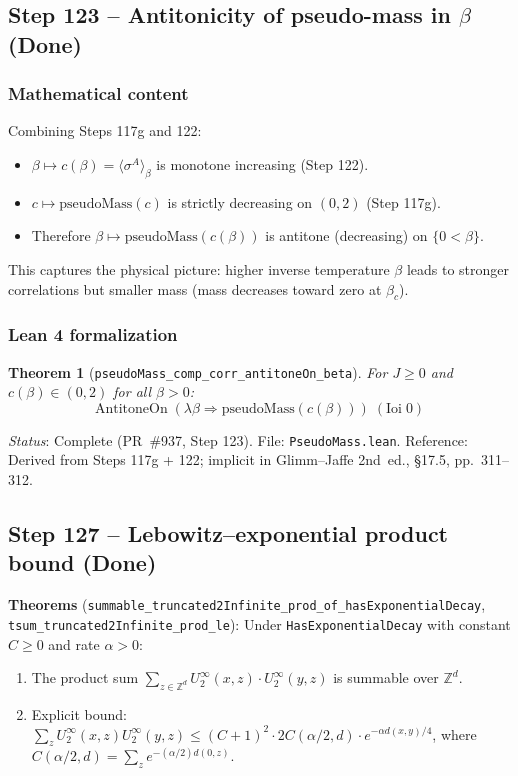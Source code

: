 \documentclass[a4paper,11pt]{article}
\newtheorem{theorem}{Theorem}
\begin{document}
\subsection*{Step 123 -- Antitonicity of pseudo-mass in $\beta$ (Done)}

\subsubsection*{Mathematical content}

Combining Steps 117g and 122:
\begin{itemize}
  \item $\beta \mapsto c(\beta) = \langle \sigma^A \rangle_\beta$ is monotone increasing (Step 122).
  \item $c \mapsto \mathrm{pseudoMass}(c)$ is strictly decreasing on $(0,2)$ (Step 117g).
  \item Therefore $\beta \mapsto \mathrm{pseudoMass}(c(\beta))$ is antitone (decreasing) on $\{0 < \beta\}$.
\end{itemize}

This captures the physical picture: higher inverse temperature $\beta$ leads to
stronger correlations but smaller mass (mass decreases toward zero at $\beta_c$).

\subsubsection*{Lean 4 formalization}

\begin{theorem}[\texttt{pseudoMass\_comp\_corr\_antitoneOn\_beta}]
For $J \geq 0$ and $c(\beta) \in (0,2)$ for all $\beta > 0$:
\[
  \mathrm{AntitoneOn}\;(\lambda\beta \Rightarrow
    \mathrm{pseudoMass}(c(\beta)))\;(\mathrm{Ioi}\;0)
\]
\end{theorem}

\noindent\textit{Status}: Complete (PR~\#937, Step 123).
File: \texttt{PseudoMass.lean}.
Reference: Derived from Steps 117g + 122; implicit in Glimm--Jaffe 2nd~ed., \S17.5, pp.~311--312.

\subsection*{Step 127 -- Lebowitz--exponential product bound (Done)}

\noindent\textbf{Theorems} (\texttt{summable\_truncated2Infinite\_prod\_of\_hasExponentialDecay},
\texttt{tsum\_truncated2Infinite\_prod\_le}):
Under \texttt{HasExponentialDecay} with constant $C \geq 0$ and rate $\alpha > 0$:
\begin{enumerate}
\item The product sum $\sum_{z \in \mathbb{Z}^d} U_2^\infty(x,z) \cdot U_2^\infty(y,z)$
  is summable over $\mathbb{Z}^d$.
\item Explicit bound:
  $\sum_z U_2^\infty(x,z) U_2^\infty(y,z) \leq (C+1)^2 \cdot 2C(\alpha/2,d) \cdot e^{-\alpha d(x,y)/4}$,
  where $C(\alpha/2,d) = \sum_z e^{-(\alpha/2)d(0,z)}$.
\end{enumerate}
\end{document}

